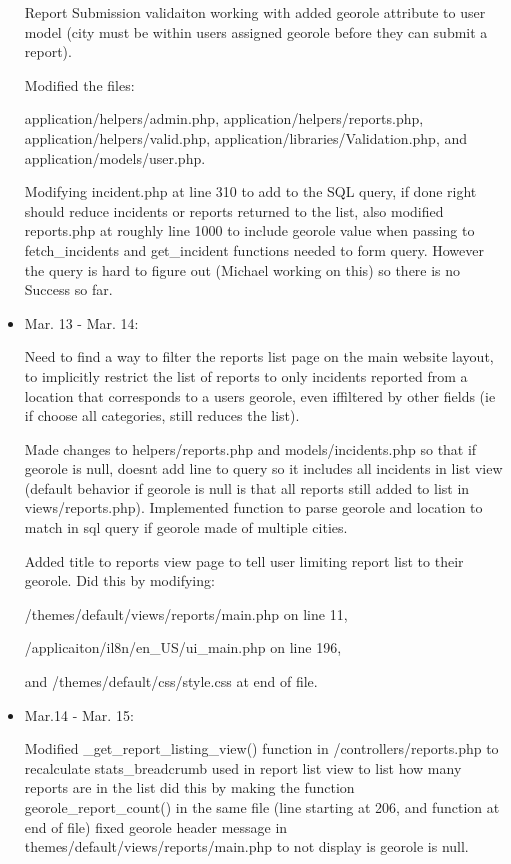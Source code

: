 \documentclass{article}
\begin{document}
\begin{itemize}
Report Submission validaiton working with added georole attribute to user model (city must be within users assigned georole before they can submit a report).

Modified the files:

application/helpers/admin.php, 
application/helpers/reports.php, 
application/helpers/valid.php, 
application/libraries/Validation.php, 
and application/models/user.php.
 	   
Modifying incident.php at line 310 to add to the SQL query, if done right should reduce incidents or reports returned to the list, also modified reports.php at roughly line 1000 to include georole value when passing to fetch\_incidents and get\_incident functions needed to form query.  However the query is hard to figure out (Michael working on this) so there is no Success so far.
 	     
\item Mar. 13 - Mar. 14:
            
Need to find a way to filter the reports list page on the main website layout, to implicitly restrict the list of reports to only incidents reported from a location that corresponds to a users georole, even iffiltered by other fields (ie if choose all categories, still reduces the list).
         
Made changes to helpers/reports.php and models/incidents.php so that if georole is null, doesnt add line to query so it includes all incidents in list view (default behavior if georole is null is that all reports still added to list in views/reports.php). Implemented function to parse georole and location to match in sql query if georole made of multiple cities.
              
Added title to reports view page to tell user limiting 
report list to their georole. Did this by modifying:

/themes/default/views/reports/main.php on line 11,

/applicaiton/il8n/en\_US/ui\_main.php on line 196,

and /themes/default/css/style.css at end of file.

                
\item Mar.14 - Mar. 15:
                                
Modified \_get\_report\_listing\_view() function in /controllers/reports.php to recalculate stats\_breadcrumb used in report list view to list how many reports are in the list did this by making the function georole\_report\_count() in the same file (line starting at 206, and function at end of file) fixed georole header message in themes/default/views/reports/main.php to not display is georole is null.
                    

\end{itemize}
\end{document}
